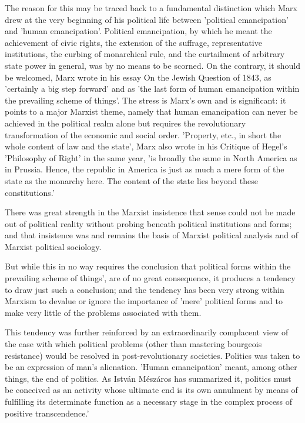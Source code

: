 The reason for this may be traced back to a fundamental distinction which Marx drew at the very beginning of his political life between 'political emancipation' and 'human emancipation'. Political emancipation, by which he meant the achievement of civic rights, the extension of the suffrage, representative institutions, the curbing of monarchical rule, and the curtailment of arbitrary state power in general, was by no means to be scorned. On the contrary, it should be welcomed, Marx wrote in his essay On the Jewish Question of 1843, as 'certainly a big step forward' and as 'the last form of human emancipation within the prevailing scheme of things'. The stress is Marx's own and is significant: it points to a major Marxist theme, namely that human emancipation can never be achieved in the political realm alone but requires the revolutionary transformation of the economic and social order. 'Property, etc., in short the whole content of law and the state', Marx also wrote in his Critique of Hegel's 'Philosophy of Right' in the same year, 'is broadly the same in North America as in Prussia. Hence, the republic in America is just as much a mere form of the state as the monarchy here. The content of the state lies beyond these constitutions.'

There was great strength in the Marxist insistence that sense could not be made out of political reality without probing beneath political institutions and forms; and that insistence was and remains the basis of Marxist political analysis and of Marxist political sociology.

But while this in no way requires the conclusion that political forms within the prevailing scheme of things', are of no great consequence, it produces a tendency to draw just such a conclusion; and the tendency has been very strong within Marxism to devalue or ignore the importance of 'mere' political forms and to make very little of the problems associated with them.

This tendency was further reinforced by an extraordinarily complacent view of the ease with which political problems (other than mastering bourgeois resistance) would be resolved in post-revolutionary societies. Politics was taken to be an expression of man's alienation. 'Human emancipation' meant, among other things, the end of politics. As István Mészáros has summarized it, politics must be conceived as an activity whose ultimate end is its own annulment by means of fulfilling its determinate function as a necessary stage in the complex process of positive transcendence.'

